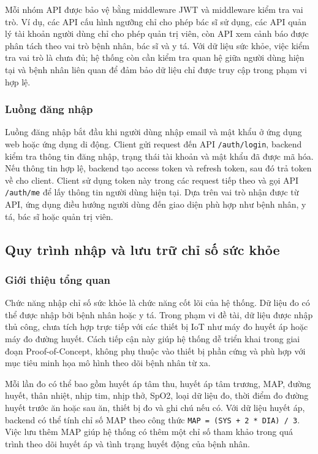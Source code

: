 \par Mỗi nhóm API được bảo vệ bằng middleware JWT và middleware kiểm tra vai trò. Ví dụ, các API cấu hình ngưỡng chỉ cho phép bác sĩ sử dụng, các API quản lý tài khoản người dùng chỉ cho phép quản trị viên, còn API xem cảnh báo được phân tách theo vai trò bệnh nhân, bác sĩ và y tá. Với dữ liệu sức khỏe, việc kiểm tra vai trò là chưa đủ; hệ thống còn cần kiểm tra quan hệ giữa người dùng hiện tại và bệnh nhân liên quan để đảm bảo dữ liệu chỉ được truy cập trong phạm vi hợp lệ.

\subsubsection{Luồng đăng nhập}
\par Luồng đăng nhập bắt đầu khi người dùng nhập email và mật khẩu ở ứng dụng web hoặc ứng dụng di động. Client gửi request đến API \texttt{/auth/login}, backend kiểm tra thông tin đăng nhập, trạng thái tài khoản và mật khẩu đã được mã hóa. Nếu thông tin hợp lệ, backend tạo access token và refresh token, sau đó trả token về cho client. Client sử dụng token này trong các request tiếp theo và gọi API \texttt{/auth/me} để lấy thông tin người dùng hiện tại. Dựa trên vai trò nhận được từ API, ứng dụng điều hướng người dùng đến giao diện phù hợp như bệnh nhân, y tá, bác sĩ hoặc quản trị viên.

\subsection{Quy trình nhập và lưu trữ chỉ số sức khỏe}

\subsubsection{Giới thiệu tổng quan}
\par Chức năng nhập chỉ số sức khỏe là chức năng cốt lõi của hệ thống. Dữ liệu đo có thể được nhập bởi bệnh nhân hoặc y tá. Trong phạm vi đề tài, dữ liệu được nhập thủ công, chưa tích hợp trực tiếp với các thiết bị IoT như máy đo huyết áp hoặc máy đo đường huyết. Cách tiếp cận này giúp hệ thống dễ triển khai trong giai đoạn Proof-of-Concept, không phụ thuộc vào thiết bị phần cứng và phù hợp với mục tiêu minh họa mô hình theo dõi bệnh nhân từ xa.

\par Mỗi lần đo có thể bao gồm huyết áp tâm thu, huyết áp tâm trương, MAP, đường huyết, thân nhiệt, nhịp tim, nhịp thở, SpO2, loại dữ liệu đo, thời điểm đo đường huyết trước ăn hoặc sau ăn, thiết bị đo và ghi chú nếu có. Với dữ liệu huyết áp, backend có thể tính chỉ số MAP theo công thức \texttt{MAP = (SYS + 2 * DIA) / 3}. Việc lưu thêm MAP giúp hệ thống có thêm một chỉ số tham khảo trong quá trình theo dõi huyết áp và tình trạng huyết động của bệnh nhân.

